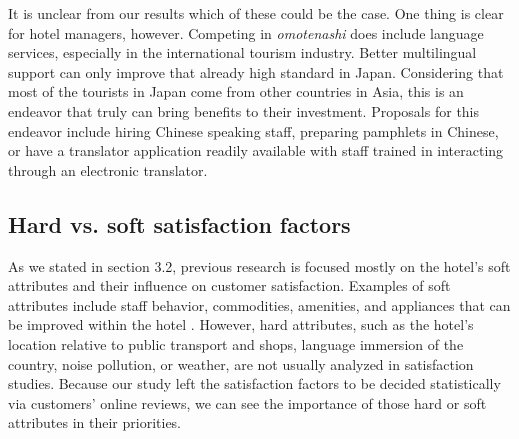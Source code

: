 \documentclass[smallextended,natbib]{svjour3}       %
\begin{document}
    It is unclear from our results which of these could be the case. One thing is clear for hotel managers, however. Competing in \textit{omotenashi} does include language services, especially in the international tourism industry. Better multilingual support can only improve that already high standard in Japan. Considering that most of the tourists in Japan come from other countries in Asia, this is an endeavor that truly can bring benefits to their investment. Proposals for this endeavor include hiring Chinese speaking staff, preparing pamphlets in Chinese, or have a translator application readily available with staff trained in interacting through an electronic translator.

  \subsection{Hard vs. soft satisfaction factors}\label{disc:hard_soft}

    As we stated in section 3.2, previous research is focused mostly on the hotel's soft attributes and their influence on customer satisfaction. Examples of soft attributes include staff behavior, commodities, amenities, and appliances that can be improved within the hotel \cite[e.g.][]{shanka2004,choi2001}. However, hard attributes, such as the hotel's location relative to public transport and shops, language immersion of the country, noise pollution, or weather, are not usually analyzed in satisfaction studies. Because our study left the satisfaction factors to be decided statistically via customers’ online reviews, we can see the importance of those hard or soft attributes in their priorities.
\end{document}
